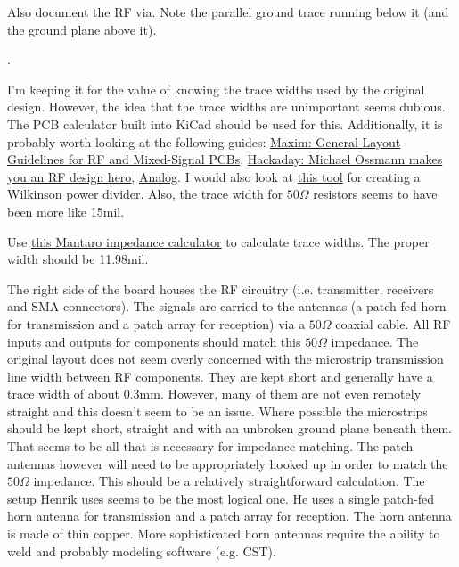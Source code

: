 \documentclass{default}
\begin{document}
Also document the RF via. Note the parallel ground trace running below it (and the ground plane
above it).

.

I'm keeping it for the value of knowing the trace widths used by the original design. However, the
idea that the trace widths are unimportant seems dubious. The PCB calculator built into KiCad should
be used for this. Additionally, it is probably worth looking at the following guides:
\href{https://www.maximintegrated.com/en/app-notes/index.mvp/id/5100#}{Maxim: General Layout
  Guidelines for RF and Mixed-Signal PCBs},
\href{https://hackaday.com/2016/03/23/michael-ossmann-makes-you-an-rf-design-hero/}{Hackaday:
  Michael Ossmann makes you an RF design hero},
\href{https://www.analog.com/media/en/training-seminars/design-handbooks/Basic-Linear-Design/Chapter12.pdf}{Analog}. I
would also look at \href{https://github.com/erichVK5/WilkinsonPowerDividerFootprintGenerator}{this
  tool} for creating a Wilkinson power divider. Also, the trace width for $50\si{\Omega}$ resistors
seems to have been more like 15mil.

Use \href{http://www.mantaro.com/resources/impedance-calculator.htm}{this Mantaro impedance
  calculator} to calculate trace widths. The proper width should be 11.98mil.

The right side of the board houses the RF circuitry (i.e. transmitter, receivers and SMA
connectors). The signals are carried to the antennas (a patch-fed horn for transmission and a patch
array for reception) via a $50\si{\Omega}$ coaxial cable. All RF inputs and outputs for components
should match this $50\si{\Omega}$ impedance. The original layout does not seem overly concerned with
the microstrip transmission line width between RF components. They are kept short and generally have
a trace width of about 0.3mm. However, many of them are not even remotely straight and this doesn't
seem to be an issue. Where possible the microstrips should be kept short, straight and with an
unbroken ground plane beneath them. That seems to be all that is necessary for impedance
matching. The patch antennas however will need to be appropriately hooked up in order to match the
$50\si{\Omega}$ impedance. This should be a relatively straightforward calculation. The setup Henrik
uses seems to be the most logical one. He uses a single patch-fed horn antenna for transmission and
a patch array for reception. The horn antenna is made of thin copper. More sophisticated horn
antennas require the ability to weld and probably modeling software (e.g. CST).
\end{document}
